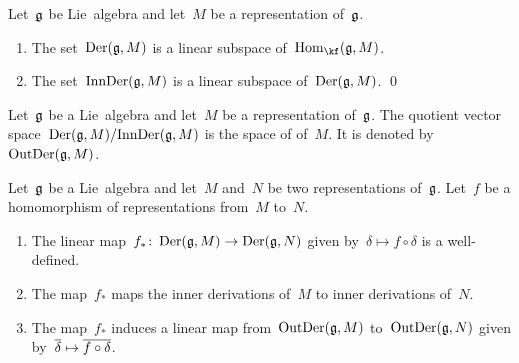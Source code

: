 \begin{proposition}
	Let~$\mathfrak{g}$ be Lie~algebra and let~$M$ be a representation of~$\mathfrak{g}$.
	\begin{enumerate}
		\item
			The set~$\operatorname{Der}(\mathfrak{g}, M)$ is a linear subspace of~$\Hom_{\kf}(\glie, M)$.
		\item
			The set~$\operatorname{InnDer}(\mathfrak{g}, M)$ is a linear subspace of~$\operatorname{Der}(\mathfrak{g}, M)$.
		\qed
	\end{enumerate}
\end{proposition}


\begin{definition}
	Let~$\mathfrak{g}$ be a Lie~algebra and let~$M$ be a representation of~$\mathfrak{g}$.
	The quotient vector space~$\operatorname{Der}(\mathfrak{g}, M) / { \operatorname{InnDer}(\mathfrak{g}, M) }$ is the space of  of~$M$.
	It is denoted by~$\operatorname{OutDer}(\mathfrak{g}, M)$.
\end{definition}


\begin{proposition}
	\label{functiorality of outer derivations}
	Let~$\mathfrak{g}$ be a Lie~algebra and let~$M$ and~$N$ be two representations of~$\mathfrak{g}$.
	Let~$f$ be a homomorphism of representations from~$M$ to~$N$.
	\begin{enumerate}
		\item
			The linear map~$f_* \colon \Der(\glie, M) \to \Der(\glie, N)$ given by~$\delta \mapsto f \circ \delta$ is a well-defined.
		\item
			The map~$f_*$ maps the inner derivations of~$M$ to inner derivations of~$N$.
		\item
			The map~$f_*$ induces a linear map from~$\operatorname{OutDer}(\mathfrak{g}, M)$ to~$\operatorname{OutDer}(\mathfrak{g}, N)$ given by~$\class{\delta} \mapsto \class{f \circ \delta}$.
	\end{enumerate}
\end{proposition}


